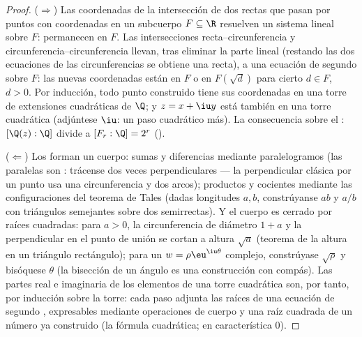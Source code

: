 \begin{proof}
($\Rightarrow$) Las coordenadas de la intersección de dos rectas que
pasan por puntos con coordenadas en un subcuerpo $F \subseteq \R$
resuelven un sistema lineal sobre $F$: permanecen en $F$. Las
intersecciones recta--circunferencia y circunferencia--circunferencia
llevan, tras eliminar la parte lineal (restando las dos ecuaciones de
las circunferencias se obtiene una recta), a una ecuación de segundo
 sobre $F$: las nuevas coordenadas están en $F$ o en $F(\sqrt d)$
para cierto $d \in F$, $d > 0$. Por inducción, todo punto construido
tiene sus coordenadas en una torre de extensiones cuadráticas de $\Q$; y
$z = x + \iu y$ está también en una torre cuadrática (adjúntese $\iu$:
un paso cuadrático más). La consecuencia sobre el
: $[\Q(z):\Q]$ divide a
$[F_r : \Q] = 2^r$ ().

($\Leftarrow$) Los  forman un cuerpo: sumas y diferencias mediante
paralelogramos (las paralelas son
: trácense dos veces
perpendiculares --- la perpendicular clásica por un punto usa una
circunferencia y dos arcos); productos y cocientes mediante las
configuraciones del teorema de Tales (dadas longitudes $a, b$,
constrúyanse $ab$ y $a/b$ con triángulos semejantes sobre dos
semirrectas). Y el cuerpo es cerrado por raíces cuadradas: para $a > 0$,
la circunferencia de diámetro $1 + a$ y la perpendicular en el punto de
unión se cortan a altura $\sqrt a$ (teorema de la altura en un triángulo
rectángulo); para un $w = \rho\eu^{\iu\theta}$ complejo, constrúyase
$\sqrt\rho$ y bisóquese $\theta$ (la bisección de un ángulo es una
construcción con compás). Las partes real e imaginaria de los elementos
de una torre cuadrática son, por tanto,
 por inducción sobre
la torre: cada paso adjunta las raíces de una ecuación de segundo ,
expresables mediante operaciones de cuerpo y una raíz cuadrada de un
número ya construido (la fórmula cuadrática; en característica $0$).
\end{proof}

